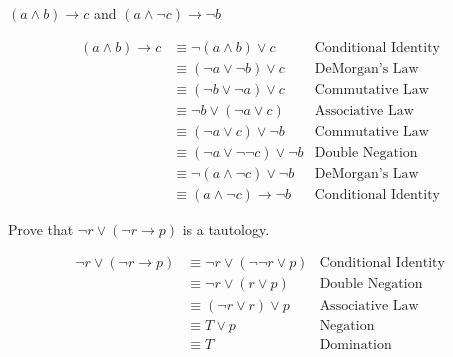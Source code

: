 \documentclass[homework, problems]{../../latex-common/cs151-common}
\begin{document}
\begin{enumeratequestions}
    \item $(a \wedge b) \rightarrow c$  and $(a \wedge \neg c) \rightarrow \neg b$

    \begin{solution}
    \begin{align*}
            (a \wedge b) \rightarrow c &\equiv \neg (a \wedge b) \vee c & \text{Conditional Identity} \\
            &\equiv (\neg a \vee \neg b) \vee c & \text{DeMorgan's Law} \\
            &\equiv (\neg b \vee \neg a) \vee c & \text{Commutative Law} \\
            &\equiv \neg b \vee (\neg a \vee c) & \text{Associative Law} \\
            &\equiv (\neg a \vee c) \vee \neg b & \text{Commutative Law} \\
            &\equiv (\neg a \vee \neg \neg c) \vee \neg b & \text{Double Negation } \\
            &\equiv \neg (a \wedge \neg c) \vee \neg b & \text{DeMorgan's Law} \\
            &\equiv (a \wedge \neg c) \rightarrow \neg b & \text{Conditional Identity}
    \end{align*}
    \end{solution}

    \item Prove that $\neg r \vee (\neg r \rightarrow p)$ is a tautology.

    \begin{solution}
    \begin{align*}
            \neg r \vee (\neg r \rightarrow p) &\equiv \neg r \vee (\neg \neg r \vee p) & \text{Conditional Identity} \\
            &\equiv \neg r \vee (r \vee p) & \text{Double Negation} \\
            &\equiv (\neg r \vee r) \vee p & \text{Associative Law} \\
            &\equiv T \vee p & \text{Negation} \\
            &\equiv T & \text{Domination} 
        \end{align*}
    \end{solution}
\end{enumeratequestions}

\solutionnewpage
\end{document}
